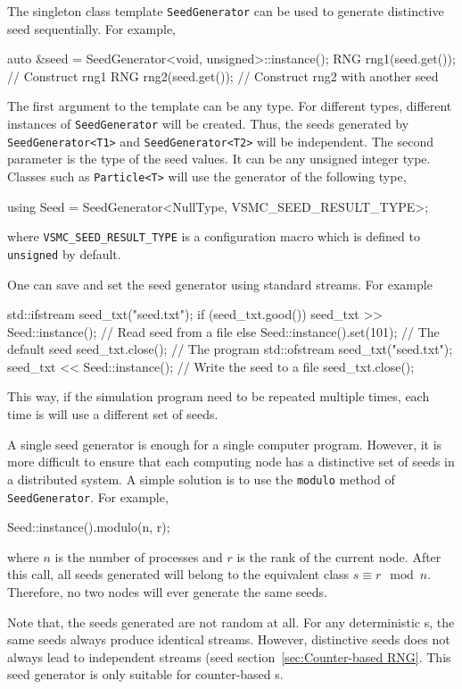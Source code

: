 The singleton class template \verb|SeedGenerator| can be used to generate
distinctive seed sequentially. For example,
\begin{cppcode}
  auto &seed = SeedGenerator<void, unsigned>::instance();
  RNG rng1(seed.get()); // Construct rng1
  RNG rng2(seed.get()); // Construct rng2 with another seed
\end{cppcode}
The first argument to the template can be any type. For different types,
different instances of \verb|SeedGenerator| will be created. Thus, the seeds
generated by \verb|SeedGenerator<T1>| and \verb|SeedGenerator<T2>| will be
independent. The second parameter is the type of the seed values. It can be any
unsigned integer type. Classes such as \verb|Particle<T>| will use the
generator of the following type,
\begin{cppcode}
  using Seed = SeedGenerator<NullType, VSMC_SEED_RESULT_TYPE>;
\end{cppcode}
where \verb|VSMC_SEED_RESULT_TYPE| is a configuration macro which is defined to
\verb|unsigned| by default.

One can save and set the seed generator using standard \cpp streams. For
example
\begin{cppcode}
  std::ifstream seed_txt("seed.txt");
  if (seed_txt.good())
      seed_txt >> Seed::instance(); // Read seed from a file
  else
      Seed::instance().set(101);    // The default seed
  seed_txt.close();
  // The program
  std::ofstream seed_txt("seed.txt");
  seed_txt << Seed::instance();     // Write the seed to a file
  seed_txt.close();
\end{cppcode}
This way, if the simulation program need to be repeated multiple times, each
time is will use a different set of seeds.

A single seed generator is enough for a single computer program. However, it is
more difficult to ensure that each computing node has a distinctive set of
seeds in a distributed system. A simple solution is to use the \verb|modulo|
method of \verb|SeedGenerator|. For example,
\begin{cppcode}
  Seed::instance().modulo(n, r);
\end{cppcode}
where $n$ is the number of processes and $r$ is the rank of the current node.
After this call, all seeds generated will belong to the equivalent class $s
\equiv r \mod n$. Therefore, no two nodes will ever generate the same seeds.

Note that, the seeds generated are not random at all. For any deterministic
\rng{}s, the same seeds always produce identical streams. However, distinctive
seeds does not always lead to independent streams (seed
section~\ref{sec:Counter-based RNG}. This seed generator is only suitable for
counter-based \rng{}s.
